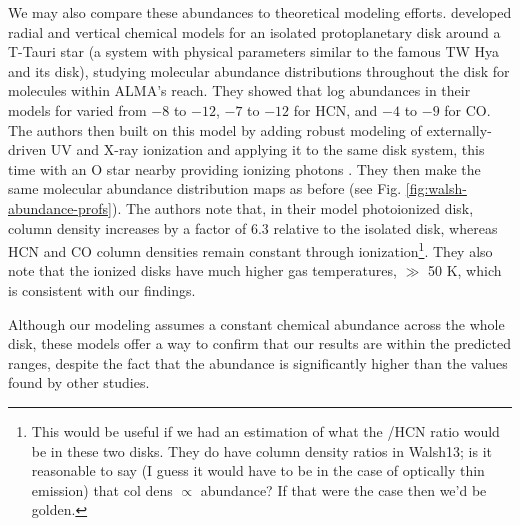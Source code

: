 We may also compare these abundances to theoretical modeling efforts. \citet{Walsh2010} developed radial and vertical chemical models for an isolated protoplanetary disk around a T-Tauri star (a system with physical parameters similar to the famous TW Hya and its disk), studying molecular abundance distributions throughout the disk for molecules within ALMA's reach. They showed that log abundances in their models for \hco varied from $-8$ to $-12$, $-7$ to $-12$ for HCN, and $-4$ to $-9$ for CO. The authors then built on this model by adding robust modeling of externally-driven UV and X-ray ionization \citep{Walsh2012} and applying it to the same disk system, this time with an O star nearby providing ionizing photons \citep{Walsh2013}. They then make the same molecular abundance distribution maps as before (see Fig. \ref{fig:walsh-abundance-profs}). The authors note that, in their model photoionized disk, \hco column density increases by a factor of 6.3 relative to the isolated disk, whereas HCN and CO column densities remain constant through ionization\footnote{This would be useful if we had an estimation of what the \hco/HCN ratio would be in these two disks. They do have column density ratios in Walsh13; is it reasonable to say (I guess it would have to be in the case of optically thin emission) that col dens $\propto$ abundance? If that were the case then we'd be golden.}. They also note that the ionized disks have much higher gas temperatures, $\gg$ 50 K, which is consistent with our findings.


Although our modeling assumes a constant chemical abundance across the whole disk, these models offer a way to confirm that our results are within the predicted ranges, despite the fact that the \hco abundance is significantly higher than the values found by other studies.




